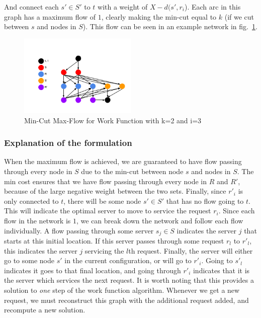 And connect each $s' \in S'$ to $t$ with a weight of $X-d(s', r_i$). Each arc in this graph has a maximum flow of $1$, clearly making the min-cut equal to $k$ (if we cut between $s$ and nodes in $S$). This flow can be seen in an example network in fig.~\ref{fig:mcfp}.

\begin{figure}[h]
    \centering
    \includegraphics[width=0.5\textwidth]{images/mcfp.png}
    \caption{Min-Cut Max-Flow for Work Function with k=2 and i=3}
    \label{fig:mcfp}
\end{figure}

\subsubsection*{Explanation of the formulation}
When the maximum flow is achieved, we are guaranteed to have flow passing through every node in $S$ due to the min-cut between node $s$ and nodes in $S$. The min cost ensures that we have flow passing through every node in $R$ and $R'$, because of the large negative weight between the two sets. Finally, since $r'_i$ is only connected to $t$, there will be some node $s' \in S'$ that has no flow going to $t$. This will indicate the optimal server to move to service the request $r_i$. Since each flow in the network is $1$, we can break down the network and follow each flow individually. A flow passing through some server $s_j \in S$ indicates the server $j$ that starts at this initial location. If this server passes through some request $r_l$ to $r'_l$, this indicates the server $j$ servicing the $l$th request. Finally, the server will either go to some node $s'$ in the current configuration, or will go to $r'_i$. Going to $s'_l$ indicates it goes to that final location, and going through $r'_i$ indicates that it is the server which services the next request. It is worth noting that this provides a solution to \textit{one} step of the work function algorithm. Whenever we get a new request, we must reconstruct this graph with the additional request added, and recompute a new solution.

